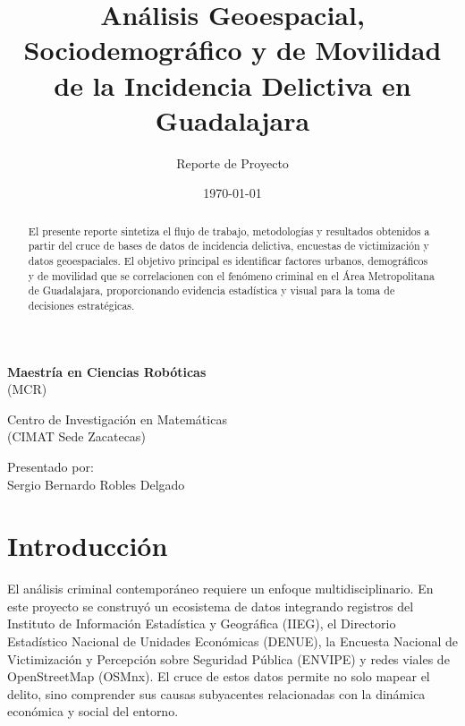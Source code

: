 \documentclass[12pt, a4paper]{article}
\title{\textbf{Análisis Geoespacial, Sociodemográfico y de Movilidad de la Incidencia Delictiva en Guadalajara}}
\author{Reporte de Proyecto}
\date{\today}
\begin{document}
\maketitle
\begin{center}
{\Large \textbf{Maestría en Ciencias Robóticas}} \\
{\large (MCR)} \\
\vspace{0.8cm}

{\large Centro de Investigación en Matemáticas} \\
{\large (CIMAT Sede Zacatecas)} \\
\vspace{1.5cm}

{\large Presentado por:} \\
{\Large Sergio Bernardo Robles Delgado} \\
\end{center}

\begin{abstract}
El presente reporte sintetiza el flujo de trabajo, metodologías y resultados obtenidos a partir del cruce de bases de datos de incidencia delictiva, encuestas de victimización y datos geoespaciales. El objetivo principal es identificar factores urbanos, demográficos y de movilidad que se correlacionen con el fenómeno criminal en el Área Metropolitana de Guadalajara, proporcionando evidencia estadística y visual para la toma de decisiones estratégicas.
\end{abstract}

\tableofcontents
\newpage

\section{Introducción}
El análisis criminal contemporáneo requiere un enfoque multidisciplinario. En este proyecto se construyó un ecosistema de datos integrando registros del Instituto de Información Estadística y Geográfica (IIEG), el Directorio Estadístico Nacional de Unidades Económicas (DENUE), la Encuesta Nacional de Victimización y Percepción sobre Seguridad Pública (ENVIPE) y redes viales de OpenStreetMap (OSMnx). El cruce de estos datos permite no solo mapear el delito, sino comprender sus causas subyacentes relacionadas con la dinámica económica y social del entorno.
\end{document}

